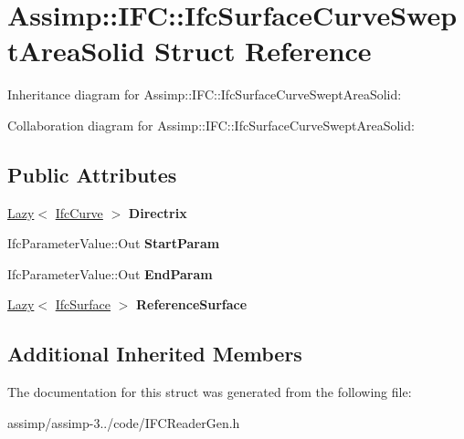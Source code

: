 \hypertarget{struct_assimp_1_1_i_f_c_1_1_ifc_surface_curve_swept_area_solid}{\section{Assimp\+:\+:I\+F\+C\+:\+:Ifc\+Surface\+Curve\+Swept\+Area\+Solid Struct Reference}
\label{struct_assimp_1_1_i_f_c_1_1_ifc_surface_curve_swept_area_solid}
}


Inheritance diagram for Assimp\+:\+:I\+F\+C\+:\+:Ifc\+Surface\+Curve\+Swept\+Area\+Solid\+:


Collaboration diagram for Assimp\+:\+:I\+F\+C\+:\+:Ifc\+Surface\+Curve\+Swept\+Area\+Solid\+:
\subsection*{Public Attributes}
\begin{DoxyCompactItemize}
\item 
\hypertarget{struct_assimp_1_1_i_f_c_1_1_ifc_surface_curve_swept_area_solid_a28c3f5320a50eb0b7458af6359b70af0}{\hyperlink{struct_assimp_1_1_s_t_e_p_1_1_lazy}{Lazy}$<$ \hyperlink{struct_assimp_1_1_i_f_c_1_1_ifc_curve}{Ifc\+Curve} $>$ {\bfseries Directrix}}\label{struct_assimp_1_1_i_f_c_1_1_ifc_surface_curve_swept_area_solid_a28c3f5320a50eb0b7458af6359b70af0}

\item 
\hypertarget{struct_assimp_1_1_i_f_c_1_1_ifc_surface_curve_swept_area_solid_a84a760897c437004d83fc25a1472abdc}{Ifc\+Parameter\+Value\+::\+Out {\bfseries Start\+Param}}\label{struct_assimp_1_1_i_f_c_1_1_ifc_surface_curve_swept_area_solid_a84a760897c437004d83fc25a1472abdc}

\item 
\hypertarget{struct_assimp_1_1_i_f_c_1_1_ifc_surface_curve_swept_area_solid_aeb81e1b28ba2e04c28c6c18da57d50d5}{Ifc\+Parameter\+Value\+::\+Out {\bfseries End\+Param}}\label{struct_assimp_1_1_i_f_c_1_1_ifc_surface_curve_swept_area_solid_aeb81e1b28ba2e04c28c6c18da57d50d5}

\item 
\hypertarget{struct_assimp_1_1_i_f_c_1_1_ifc_surface_curve_swept_area_solid_a5cbd6a568c66b385382265780a0a0253}{\hyperlink{struct_assimp_1_1_s_t_e_p_1_1_lazy}{Lazy}$<$ \hyperlink{struct_assimp_1_1_i_f_c_1_1_ifc_surface}{Ifc\+Surface} $>$ {\bfseries Reference\+Surface}}\label{struct_assimp_1_1_i_f_c_1_1_ifc_surface_curve_swept_area_solid_a5cbd6a568c66b385382265780a0a0253}

\end{DoxyCompactItemize}
\subsection*{Additional Inherited Members}


The documentation for this struct was generated from the following file\+:\begin{DoxyCompactItemize}
\item 
assimp/assimp-\/3../code/I\+F\+C\+Reader\+Gen.\+h\end{DoxyCompactItemize}
